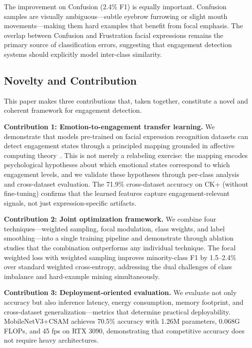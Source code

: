 \documentclass[apajournal,article,submit,pdftex,moreauthors]{Definitions/mdpi}
\begin{document}
The improvement on Confusion (2.4\% F1) is equally important. Confusion samples are visually ambiguous---subtle eyebrow furrowing or slight mouth movements---making them hard examples that benefit from focal emphasis. The overlap between Confusion and Frustration facial expressions remains the primary source of classification errors, suggesting that engagement detection systems should explicitly model inter-class similarity.

\subsection{Novelty and Contribution}

This paper makes three contributions that, taken together, constitute a novel and coherent framework for engagement detection.

\textbf{Contribution 1: Emotion-to-engagement transfer learning.}
We demonstrate that models pre-trained on facial expression recognition datasets can detect engagement states through a principled mapping grounded in affective computing theory~\citep{fredricks2004school}. This is not merely a relabeling exercise: the mapping encodes psychological hypotheses about which emotional states correspond to which engagement levels, and we validate these hypotheses through per-class analysis and cross-dataset evaluation. The 71.9\% cross-dataset accuracy on CK+ (without fine-tuning) confirms that the learned features capture engagement-relevant signals, not just expression-specific artifacts.

\textbf{Contribution 2: Joint optimization framework.}
We combine four techniques---weighted sampling, focal modulation, class weights, and label smoothing---into a single training pipeline and demonstrate through ablation studies that the combination outperforms any individual technique. The focal weighted loss with weighted sampling improves minority-class F1 by 1.5--2.4\% over standard weighted cross-entropy, addressing the dual challenges of class imbalance and hard-example mining simultaneously.

\textbf{Contribution 3: Deployment-oriented evaluation.}
We evaluate not only accuracy but also inference latency, energy consumption, memory footprint, and cross-dataset generalization---metrics that determine practical deployability. MobileNetV3+CSAM achieves 70.5\% accuracy with 1.26M parameters, 0.068G FLOPs, and 45 fps on RTX 3090, demonstrating that competitive accuracy does not require heavy architectures.
\end{document}
